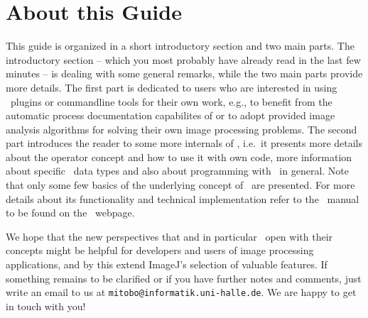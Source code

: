 \section{About this Guide}
\label{sec:about}
This guide is organized in a short introductory section and two main parts. The introductory
section -- which you most probably have already read in the last few minutes -- is dealing with
some general remarks, while the two main parts provide more details. 
The first part is dedicated to users who are interested in using \mitobo\
plugins or commandline tools for their own work, e.g., to benefit from the automatic process documentation
capabilites of \mitobo or to adopt provided image analysis algorithms for solving their own image
processing problems. 
The second part introduces the reader to some more internals of \mitobo,
i.e.~it presents more details about the operator concept and how to use it with own
code, more information about specific \mitobo\ data types and also about programming with \mitobo\
in general. Note that only some few basics of the underlying concept of \alida\ are presented. 
For more details about its functionality and technical implementation refer
to the \alida\ manual to be found on the \alida\ webpage\footnotemark[4].

We hope that the new perspectives that \alida and in particular \mitobo\ open with 
their concepts might be helpful for developers and users of image processing applications, 
and by this extend ImageJ's selection of valuable features.  
If something remains to be clarified or if you have further notes and comments, just write an email
to us at {\tt mitobo@informatik.uni-halle.de}. We are happy to get in touch with you! 
